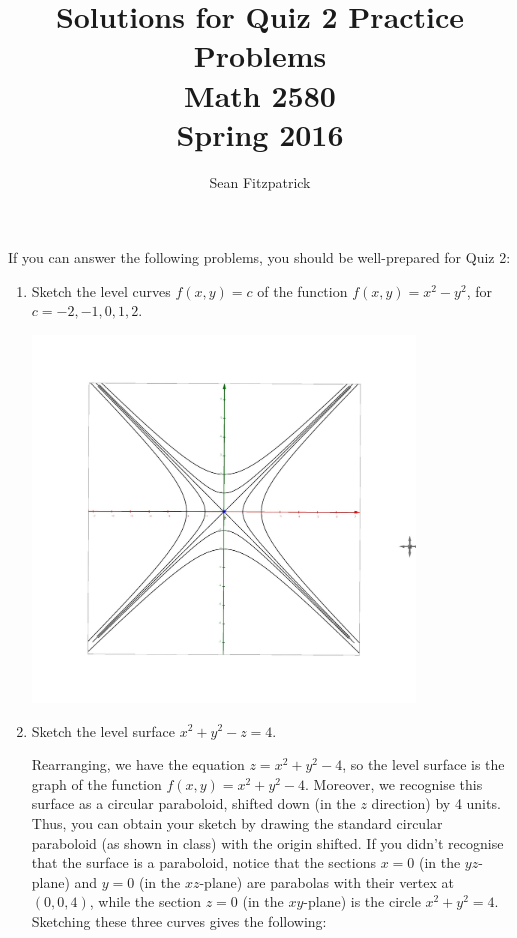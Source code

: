 \documentclass[letterpaper,12pt]{article}
\title{Solutions for Quiz 2 Practice Problems\\Math 2580\\Spring 2016}
\author{Sean Fitzpatrick}
\begin{document}
 \maketitle

If you can answer the following problems, you should be well-prepared for Quiz 2:

\begin{enumerate}
 \item Sketch the level curves $f(x,y)=c$ of the function $f(x,y)=x^2-y^2$, for $c=-2,-1,0,1,2$.

\begin{center}
 \includegraphics[width=4in]{Hyp_Par}
\end{center}

 \item Sketch the level surface $x^2+y^2-z=4$.

\bigskip

Rearranging, we have the equation $z=x^2+y^2-4$, so the level surface is the graph of the function $f(x,y)=x^2+y^2-4$. Moreover, we recognise this surface as a circular paraboloid, shifted down (in the $z$ direction) by 4 units. Thus, you can obtain your sketch by drawing the standard circular paraboloid (as shown in class) with the origin shifted. If you didn't recognise that the surface is a paraboloid, notice that the sections $x=0$ (in the $yz$-plane) and $y=0$ (in the $xz$-plane) are parabolas with their vertex at $(0,0,4)$, while the section $z=0$ (in the $xy$-plane) is the circle $x^2+y^2=4$. Sketching these three curves gives the following:


\end{enumerate}
\end{document}

